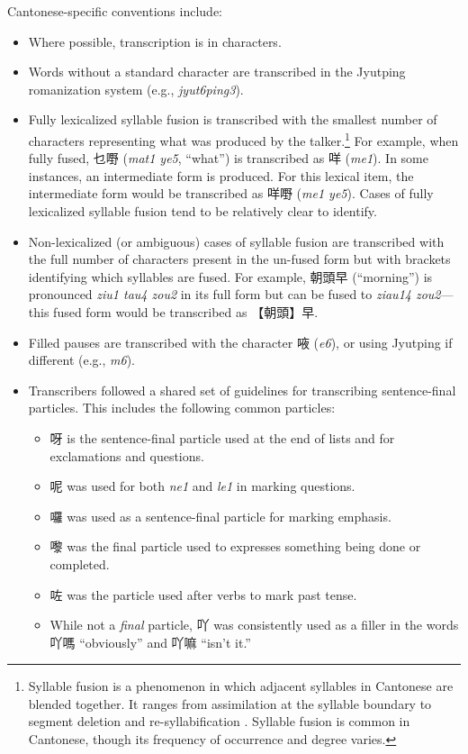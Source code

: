 Cantonese-specific conventions include:
\begin{itemize}
 \item Where possible, transcription is in characters.
 \item Words without a standard character are transcribed in the Jyutping romanization system (e.g., \textit{jyut6ping3}).
 \item Fully lexicalized syllable fusion is transcribed with the smallest number of characters representing what was produced by the talker.\footnote{Syllable fusion is a phenomenon in which adjacent syllables in Cantonese are blended together. It ranges from assimilation at the syllable boundary to segment deletion and re-syllabification \citep{wong_2006_fusion}. Syllable fusion is common in Cantonese, though its frequency of occurrence and degree varies.} For example, when fully fused, 乜嘢 (\textit{mat1 ye5}, ``what'') is transcribed as 咩 (\textit{me1}). In some instances, an intermediate form is produced. For this lexical item, the intermediate form would be transcribed as 咩嘢 (\textit{me1 ye5}). Cases of fully lexicalized syllable fusion tend to be relatively clear to identify.
 \item Non-lexicalized (or ambiguous) cases of syllable fusion are transcribed with the full number of characters present in the un-fused form but with brackets identifying which syllables are fused. For example,  朝頭早 (``morning'') is pronounced \textit{ziu1 tau4 zou2} in its full form but can be fused to \textit{ziau14 zou2}---this fused form would be transcribed as 【朝頭】早. 
 \item Filled pauses are transcribed with the character 㖡 (\textit{e6}), or using Jyutping if different (e.g., \textit{m6}). 
 \item Transcribers followed a shared set of guidelines for transcribing sentence-final particles. This includes the following common particles:
    \begin{itemize}
      \item 呀 is the sentence-final particle used at the end of lists and for exclamations and questions.
      \item 呢 was used for both \textit{ne1} and \textit{le1} in marking questions.
      \item 囉 was used as a sentence-final particle for marking emphasis.
      \item 嚟 was the final particle used to expresses something being done or completed.
      \item 咗 was the particle used after verbs to mark past tense.
      \item While not a \textit{final} particle, 吖 was consistently used as a filler in the words 吖嗎 ``obviously'' and 吖嘛 ``isn't it.''
    \end{itemize}
\end{itemize}

